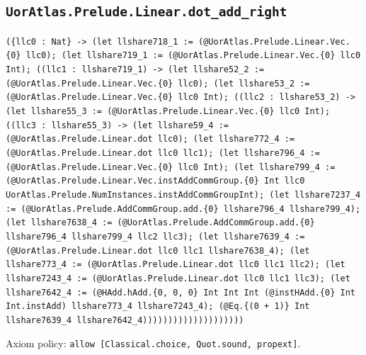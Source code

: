 \documentclass[11pt]{article}
\begin{document}
\subsection*{\texttt{UorAtlas.Prelude.Linear.dot\_add\_right}}
\noindent\texttt{(\{llc0 : Nat\} -> (let llshare718\_1 := (@UorAtlas.Prelude.Linear.Vec.\{0\} llc0); (let llshare719\_1 := (@UorAtlas.Prelude.Linear.Vec.\{0\} llc0 Int); ((llc1 : llshare719\_1) -> (let llshare52\_2 := (@UorAtlas.Prelude.Linear.Vec.\{0\} llc0); (let llshare53\_2 := (@UorAtlas.Prelude.Linear.Vec.\{0\} llc0 Int); ((llc2 : llshare53\_2) -> (let llshare55\_3 := (@UorAtlas.Prelude.Linear.Vec.\{0\} llc0 Int); ((llc3 : llshare55\_3) -> (let llshare59\_4 := (@UorAtlas.Prelude.Linear.dot llc0); (let llshare772\_4 := (@UorAtlas.Prelude.Linear.dot llc0 llc1); (let llshare796\_4 := (@UorAtlas.Prelude.Linear.Vec.\{0\} llc0 Int); (let llshare799\_4 := (@UorAtlas.Prelude.Linear.Vec.instAddCommGroup.\{0\} Int llc0 UorAtlas.Prelude.NumInstances.instAddCommGroupInt); (let llshare7237\_4 := (@UorAtlas.Prelude.AddCommGroup.add.\{0\} llshare796\_4 llshare799\_4); (let llshare7638\_4 := (@UorAtlas.Prelude.AddCommGroup.add.\{0\} llshare796\_4 llshare799\_4 llc2 llc3); (let llshare7639\_4 := (@UorAtlas.Prelude.Linear.dot llc0 llc1 llshare7638\_4); (let llshare773\_4 := (@UorAtlas.Prelude.Linear.dot llc0 llc1 llc2); (let llshare7243\_4 := (@UorAtlas.Prelude.Linear.dot llc0 llc1 llc3); (let llshare7642\_4 := (@HAdd.hAdd.\{0, 0, 0\} Int Int Int (@instHAdd.\{0\} Int Int.instAdd) llshare773\_4 llshare7243\_4); (@Eq.\{(0 + 1)\} Int llshare7639\_4 llshare7642\_4))))))))))))))))))))}\par
\noindent Axiom policy: \texttt{allow [Classical.choice, Quot.sound, propext]}.\par
\end{document}
